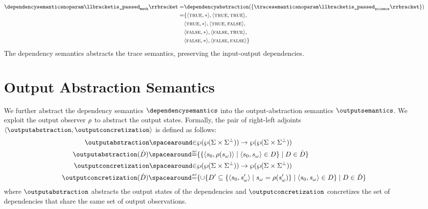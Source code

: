 \begin{example}
\begin{align*}
    \dependencysemanticsnoparam\semanticsof{\texttt{is\_passed}_\texttt{math}}
    = &\dependencyabstraction(\{\tracesemanticsnoparam\semanticsof{\texttt{is\_passed}_\texttt{science}}\}) \\
    = &\{ \tuple\true\anyvalue, \tuple\true\true, \\
      &\tuple\true\anyvalue, \tuple\true\false, \\
      &\tuple\false\anyvalue, \tuple\false\true, \\
      &\tuple\false\anyvalue, \tuple\false\false
    \}
  \end{align*}
  The dependency semantics abstracts the trace semantics, preserving the input-output dependencies.
\end{example}

\section{Output Abstraction Semantics}

We further abstract the dependency semantics $\dependencysemantics$ into the output-abstraction semantics $\outputsemantics$.
We exploit the output observer $\rho$ to abstract the output states.
Formally, the pair of right-left adjoints $\tuple{\outputabstraction}{\outputconcretization}$ is defined as follows:
%
\begin{align*}
  \outputabstraction \IN& \dependencytype \to \outputtype \\
  \outputabstraction(\defsetofsetofdependencies) \DefeQ& \setdef{
    \setdef{
      \tuple{\retrieveinput{\defstate}}{\outputobs(\retrieveoutput{\defstate})}
    }{
      \inputoutputtuple{\defstate}\in\defsetofdependencies
    }
  }{
    \defsetofdependencies \in \defsetofsetofdependencies
  }\\
  \outputconcretization \IN& \outputtype \to \dependencytype \\
  \outputconcretization(\defsetofsetofdependencies) \DefeQ& \setdef{
    \setjoin \setdef{
      \defsetofdependencies' \subseteq
      \setdef{
        \tuple{\retrieveinput\defstate}{\retrieveoutput\defstate'}
      }{
        \retrieveoutput{\defstate} = \outputobs(\retrieveoutput{\defstate'})
      }
    }{
      \inputoutputtuple{\defstate} \in \defsetofdependencies
    }
  }{
    \defsetofdependencies\in\defsetofsetofdependencies
  }
\end{align*}
where $\outputabstraction$ abstracts the output states of the dependencies and $\outputconcretization$ concretizes the set of dependencies that share the same set of output observations.

